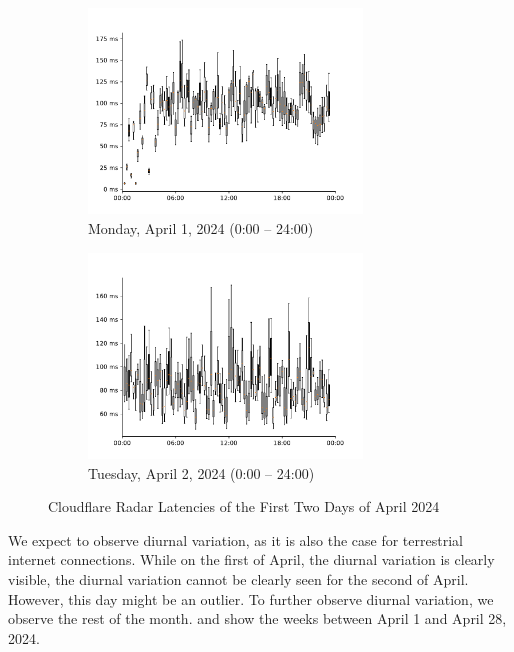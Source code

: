 \begin{figure}
	\centering
	\begin{subfigure}[b]{\textwidth}
		\centering
		\includegraphics[width=0.8\textwidth]{chapters/4-results/latency/img/cf_radar_latencies_2024-04-01_2024-04-02.pdf}
		\caption{Monday, April 1, 2024 (0:00 -- 24:00)}
	\end{subfigure}
	\begin{subfigure}[b]{\textwidth}
		\centering
		\includegraphics[width=0.8\textwidth]{chapters/4-results/latency/img/cf_radar_latencies_2024-04-02_2024-04-03.pdf}
		\caption{Tuesday, April 2, 2024 (0:00 -- 24:00)}
	\end{subfigure}
	\caption{Cloudflare Radar Latencies of the First Two Days of April 2024}
	\label{fig:latency-per-weekday-1st-2nd-april}
\end{figure}

We expect to observe diurnal variation, as it is also the case for terrestrial
internet connections. While on the first of April, the diurnal variation is
clearly visible, the diurnal variation cannot be clearly seen for the second of
April. However, this day might be an outlier. To further observe diurnal
variation, we observe the rest of the month.
 and
 show the weeks between April 1 and April
28, 2024.


